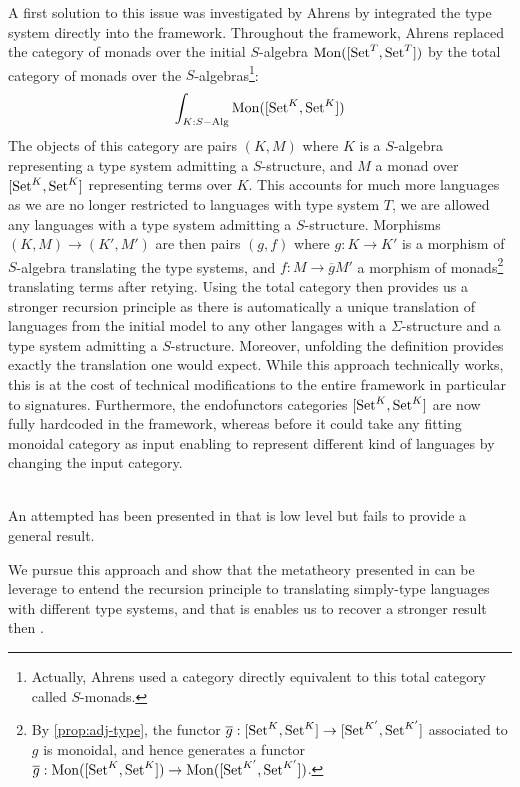 A first solution to this issue was investigated by Ahrens \cite{ExtendedInitiality12}
by integrated the type system directly into the framework.
Throughout the framework, Ahrens replaced the category of monads over the
initial $S$-algebra $\operatorname{Mon}([\operatorname{Set}^{T},\operatorname{Set}^{T}])$ by the total category of
monads over the $S$-algebras\footnote{
  Actually, Ahrens used a category directly equivalent to this total
  category called $S$-monads.}:
%
\[\int_{K : S-\mathrm{Alg}} \operatorname{Mon}([\operatorname{Set}^K,\operatorname{Set}^K]) \]
%
The objects of this category are pairs $(K,M)$ where $K$ is a $S$-algebra
representing a type system admitting a $S$-structure, and $M$ a monad over
$[\operatorname{Set}^{K},\operatorname{Set}^{K}]$ representing terms over $K$.
This accounts for much more languages as we are no longer restricted to
languages with type system $T$, we are allowed any languages with a type
system admitting a $S$-structure.
Morphisms $(K,M) \to (K',M')$ are then pairs $(g,f)$ where $g : K \to K'$ is
a morphism of $S$-algebra translating the type systems, and $f : M \to \overline{g}M'$
a morphism of monads\footnote{
  By \cref{prop:adj-type}, the functor $\overline{g} : [\operatorname{Set}^K,\operatorname{Set}^K] \to [\operatorname{Set}^{K'},\operatorname{Set}^{K'}]$
  associated to $g$ is monoidal, and hence generates a functor
  $\overline{g} : \operatorname{Mon}([\operatorname{Set}^K,\operatorname{Set}^K]) \to \operatorname{Mon}([\operatorname{Set}^{K'},\operatorname{Set}^{K'}])$.
}
translating terms after retying.
Using the total category then provides us a stronger recursion principle as
there is automatically a unique translation of languages from the initial model
to any other langages with a $\Sigma$-structure and a type system admitting a $S$-structure.
Moreover, unfolding the definition provides exactly the translation one would expect.
While this approach technically works, this is at the cost of technical modifications
to the entire framework in particular to signatures.
Furthermore, the endofunctors categories $[\operatorname{Set}^K,\operatorname{Set}^K]$ are now fully hardcoded
in the framework, whereas before it could take any fitting monoidal category as input
enabling to represent different kind of languages by changing the input category.






 \\
An attempted has been presented in \cite{IntroductionIS24} that is low level
but fails to provide a general result.

We pursue this approach and show that the metatheory presented in
 can be leverage to entend the recursion principle to
translating simply-type languages with different type systems, and that is
enables us to recover a stronger result then \cite{ExtendedInitiality12}.


